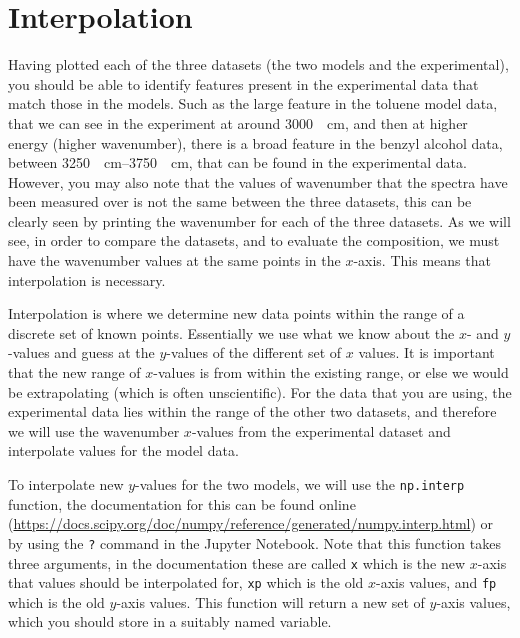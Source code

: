 \documentclass[a4paper]{article}
\begin{document}
\section{Interpolation}
Having plotted each of the three datasets (the two models and the experimental), you should be able to identify features present in the experimental data that match those in the models. 
Such as the large feature in the toluene model data, that we can see in the experiment at around \SI{3000}{\per\centi\meter}, and then at higher energy (higher wavenumber), there is a broad feature in the benzyl alcohol data, between \SIrange{3250}{3750}{\per\centi\meter}, that can be found in the experimental data. 
However, you may also note that the values of wavenumber that the spectra have been measured over is not the same between the three datasets, this can be clearly seen by printing the wavenumber for each of the three datasets. 
As we will see, in order to compare the datasets, and to evaluate the composition, we must have the wavenumber values at the same points in the $x$-axis.
This means that interpolation is necessary. 

Interpolation is where we determine new data points within the range of a discrete set of known points. 
Essentially we use what we know about the $x$- and $y$-values and guess at the $y$-values of the different set of $x$ values. 
It is important that the new range of $x$-values is from within the existing range, or else we would be extrapolating (which is often unscientific). 
For the data that you are using, the experimental data lies within the range of the other two datasets, and therefore we will use the wavenumber $x$-values from the experimental dataset and interpolate values for the model data.

To interpolate new $y$-values for the two models, we will use the \texttt{np.interp} function, the documentation for this can be found online (\url{https://docs.scipy.org/doc/numpy/reference/generated/numpy.interp.html}) or by using the \texttt{?} command in the Jupyter Notebook.
Note that this function takes three arguments, in the documentation these are called \texttt{x} which is the new $x$-axis that values should be interpolated for, \texttt{xp} which is the old $x$-axis values, and \texttt{fp} which is the old $y$-axis values. 
This function will return a new set of $y$-axis values, which you should store in a suitably named variable. 
\end{document}
